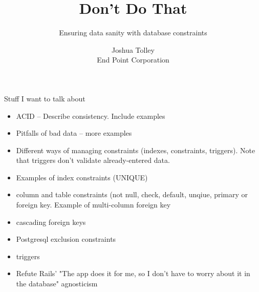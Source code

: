 \documentclass{beamer}
\begin{document}
\title{Don't Do That}
\subtitle{Ensuring data sanity with database constraints}
\author{Joshua Tolley\\
    End Point Corporation
}

\frame{\titlepage}

\begin{frame}
    Stuff I want to talk about
    \begin{itemize}
        \item ACID -- Describe consistency. Include examples
        \item Pitfalls of bad data -- more examples
        \item Different ways of managing constraints (indexes, constraints, triggers). Note that triggers don't validate already-entered data.
        \item Examples of index constraints (UNIQUE)
        \item column and table constraints (not null, check, default, unqiue, primary or foreign key. Example of multi-column foreign key
        \item cascading foreign keys
        \item Postgresql exclusion constraints
        \item triggers
        \item Refute Rails' "The app does it for me, so I don't have to worry about it in the database" agnosticism
    \end{itemize}
\end{frame}
\end{document}
